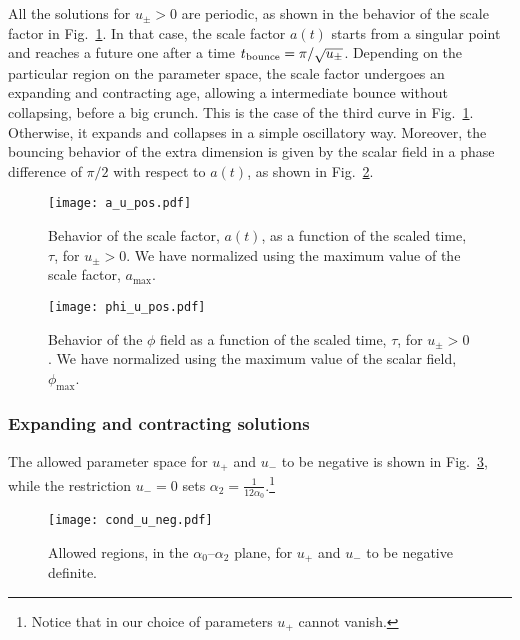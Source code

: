 \documentclass[aps,prd,12pt,superscriptaddress,showpacs,showkeys,longbibliography,reprint,nofootinbib]{revtex4-1}
\begin{document}
All the solutions for $u_\pm>0$ are periodic, as shown in the behavior of the scale factor in Fig.~\ref{a_u_pos}. In that case, the scale factor $a(t)$ starts from a singular point and reaches a future one after a time $t_{\rm bounce}=\pi/\sqrt{u_\pm}$. Depending on the particular region on the parameter space, the scale factor undergoes an expanding and contracting age, allowing a intermediate bounce without collapsing, before a big crunch. This is the case of the third curve in Fig.~\ref{a_u_pos}. Otherwise, it expands and collapses in a {simple} oscillatory way.
Moreover, the bouncing behavior of the extra dimension is given by the scalar field in a phase difference of $\pi/2$ with respect to $a(t)$, as shown in Fig.~\ref{phi_u_pos}. %
\begin{figure}[H]
  \texttt{[image: a\_u\_pos.pdf]}
  \caption{Behavior of the scale factor, \(a(t)\), as a function of the scaled time, $\tau$, for $u_\pm > 0$. We have normalized using the maximum value of the scale factor, $a_{\mathrm{max}}$.}
  \label{a_u_pos}
\end{figure}
\begin{figure}[H]
  \texttt{[image: phi\_u\_pos.pdf]}
  \caption{Behavior of the $\phi$ field as a function of the scaled time, $\tau$, for $u_\pm > 0$. We have normalized using the maximum value of the scalar field, $\phi_{\mathrm{max}}$.}
  \label{phi_u_pos}
\end{figure}

\subsubsection{Expanding and contracting solutions}

The allowed parameter space for $u_+$ and $u_-$ to be negative is shown in Fig.~\ref{cond_u_neg}, while the restriction $u_- = 0$ sets $\alpha_2 = \tfrac{1}{12 \alpha_0}$.\footnote{Notice that in our choice of parameters $u_+$ cannot vanish.}

\begin{figure}[H]
  \texttt{[image: cond\_u\_neg.pdf]}
  \caption{Allowed regions, in the $\alpha_0$--$\alpha_2$ plane, for $u_+$ and $u_-$ to be negative definite.}
  \label{cond_u_neg}  
\end{figure}
\end{document}
